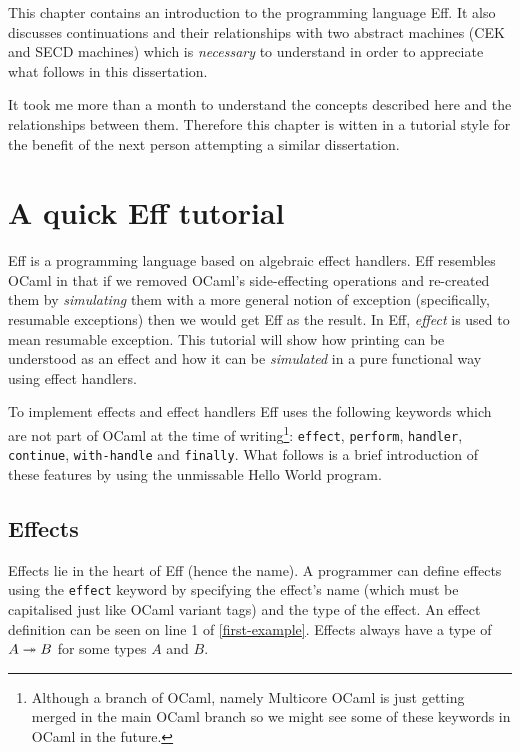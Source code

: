 \documentclass[class=article, crop=false]{standalone}
\begin{document}
This chapter contains an introduction to the programming language Eff.  It also
discusses continuations and their relationships with two abstract machines
(CEK and SECD machines) which is \emph{necessary} to understand in order to
appreciate what follows in this dissertation.

It took me more than a month to understand the concepts described here and the
relationships between them.
Therefore this chapter is witten in a tutorial style for the benefit of the next
person attempting a similar dissertation.

\section{A quick Eff tutorial}

Eff is a programming language based on algebraic effect handlers. Eff resembles
OCaml in that if we removed OCaml's \cite{ocaml-website} side-effecting
operations and re-created them by \emph{simulating} them with a more general
notion of exception (specifically, resumable exceptions) then we would get Eff
as the result. In Eff, \emph{effect} is used to mean resumable exception. This
tutorial will show how printing can be understood as an effect and how it can be
\emph{simulated} in a pure functional way using effect handlers.

To implement effects and effect handlers Eff uses the following keywords which
are not part of OCaml at the time of writing\footnote{Although a branch of OCaml,
namely Multicore OCaml is just getting merged in the main OCaml branch so we
might see some of these keywords in OCaml in the future.}: 
\lstinline{effect}, \lstinline{perform}, \lstinline{handler},
\lstinline{continue}, \lstinline{with-handle} and \lstinline{finally}.
What follows is a brief introduction of these features by using the unmissable
Hello World program.

\subsection{Effects}

Effects lie in the heart of Eff (hence the name). A programmer can define
effects using the \lstinline{effect} keyword by specifying the effect's name
(which must be capitalised just like OCaml variant tags) and the type of the
effect. An effect definition can be seen on line 1 of \autoref{first-example}.
Effects always have a type of $A \twoheadrightarrow B$ for some types $A$ and $B$.
\end{document}
